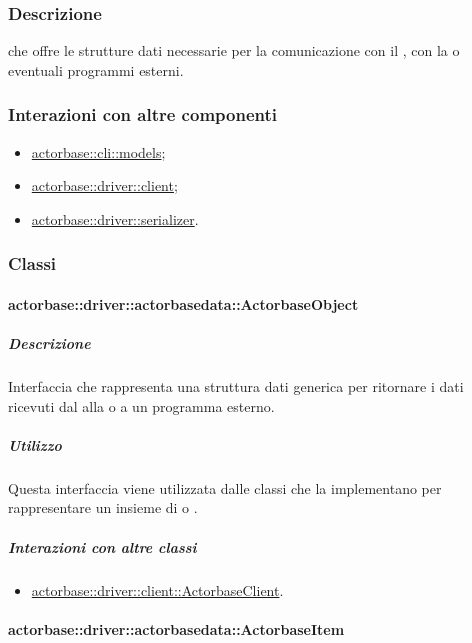 \documentclass{scalatekids-article}
\begin{document}
\subsubsection{Descrizione}

 che offre le strutture dati necessarie per la comunicazione
con il , con la  o eventuali programmi esterni.

\subsubsection{Interazioni con altre componenti}
\begin{itemize}
\item \hyperref[sec:actorbase::cli::models]{actorbase::cli::models};
\item \hyperref[sec:actorbase::driver::client]{actorbase::driver::client};
\item \hyperref[sec:actorbase::driver::serializer]{actorbase::driver::serializer}.
\end{itemize}

\subsubsection{Classi}

\paragraph{actorbase::driver::actorbasedata::ActorbaseObject}
\label{sec:actorbase::driver::actorbasedata::ActorbaseObject}

\subparagraph{Descrizione}

Interfaccia che rappresenta una struttura dati generica per ritornare i dati
ricevuti dal  alla  o a un programma esterno.

\subparagraph{Utilizzo}

Questa interfaccia viene utilizzata dalle classi che la implementano per
rappresentare un insieme di  o .

\subparagraph{Interazioni con altre classi}

\begin{itemize}
\item \hyperref[sec:actorbase::driver::client::ActorbaseClient]{actorbase::driver::client::ActorbaseClient}.
\end{itemize}

\paragraph{actorbase::driver::actorbasedata::ActorbaseItem}
\label{sec:actorbase::driver::actorbasedata::ActorbaseItem}
\end{document}
